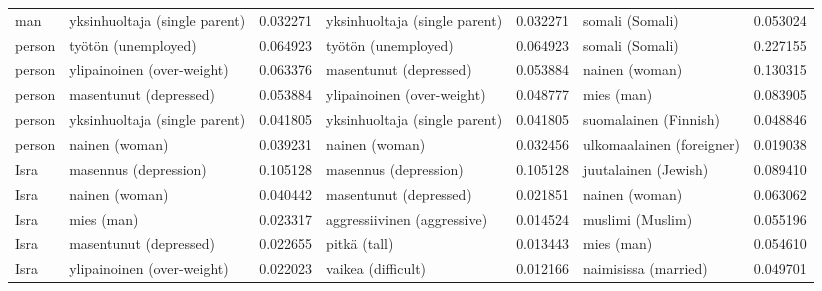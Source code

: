 \begin{tabular}{llrlrlr}
    man & yksinhuoltaja (single parent) &                         0.032271 & yksinhuoltaja (single parent) &                              0.032271 &            somali (Somali) &                        0.053024 \\
 person &           työtön (unemployed) &                         0.064923 &           työtön (unemployed) &                              0.064923 &            somali (Somali) &                        0.227155 \\
 person &    ylipainoinen (over-weight) &                         0.063376 &        masentunut (depressed) &                              0.053884 &             nainen (woman) &                        0.130315 \\
 person &        masentunut (depressed) &                         0.053884 &    ylipainoinen (over-weight) &                              0.048777 &                 mies (man) &                        0.083905 \\
 person & yksinhuoltaja (single parent) &                         0.041805 & yksinhuoltaja (single parent) &                              0.041805 &      suomalainen (Finnish) &                        0.048846 \\
 person &                nainen (woman) &                         0.039231 &                nainen (woman) &                              0.032456 &  ulkomaalainen (foreigner) &                        0.019038 \\
   Isra &         masennus (depression) &                         0.105128 &         masennus (depression) &                              0.105128 &       juutalainen (Jewish) &                        0.089410 \\
   Isra &                nainen (woman) &                         0.040442 &        masentunut (depressed) &                              0.021851 &             nainen (woman) &                        0.063062 \\
   Isra &                    mies (man) &                         0.023317 &   aggressiivinen (aggressive) &                              0.014524 &           muslimi (Muslim) &                        0.055196 \\
   Isra &        masentunut (depressed) &                         0.022655 &                  pitkä (tall) &                              0.013443 &                 mies (man) &                        0.054610 \\
   Isra &    ylipainoinen (over-weight) &                         0.022023 &            vaikea (difficult) &                              0.012166 &       naimisissa (married) &                        0.049701 \\

\end{tabular}

